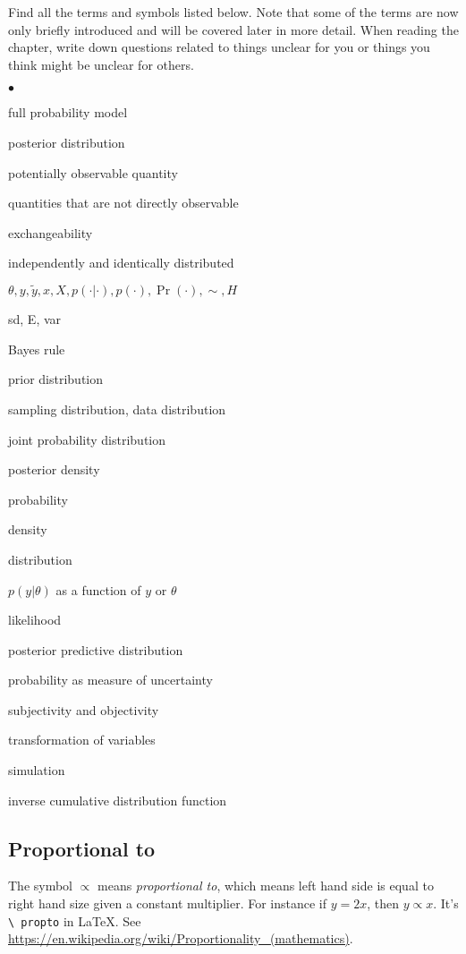 \documentclass[a4paper,11pt,english]{article}
\begin{document}
Find all the terms and symbols listed below. Note that some of the
terms are now only briefly introduced and will be covered later in
more detail.
When reading the chapter, write down questions related to things
unclear for you or things you think might be unclear for others.
\begin{list}{$\bullet$}{\parsep=0pt\itemsep=2pt}
\item full probability model
\item posterior distribution
\item potentially observable quantity
\item quantities that are not directly observable
\item exchangeability
\item independently and identically distributed
\item $\theta, y, \tilde{y}, x, X, p(\cdot|\cdot), p(\cdot), \Pr(\cdot), \sim, H$
\item sd, E, var
\item Bayes rule
\item prior distribution
\item sampling distribution, data distribution
\item joint probability distribution
\item posterior density
\item probability
\item density
\item distribution
\item $p(y|\theta)$ as a function of $y$ or $\theta$
\item likelihood
\item posterior predictive distribution
\item probability as measure of uncertainty
\item subjectivity and objectivity
\item transformation of variables
\item simulation
\item inverse cumulative distribution function
\end{list}

\subsection*{Proportional to}

The symbol $\propto$ means \textit{proportional to}, which means left
hand side is equal to right hand size given a constant multiplier. For
instance if $y=2x$, then $y \propto x$. It's \texttt{\textbackslash
  propto} in LaTeX. See
\url{https://en.wikipedia.org/wiki/Proportionality_(mathematics)}.
\end{document}
